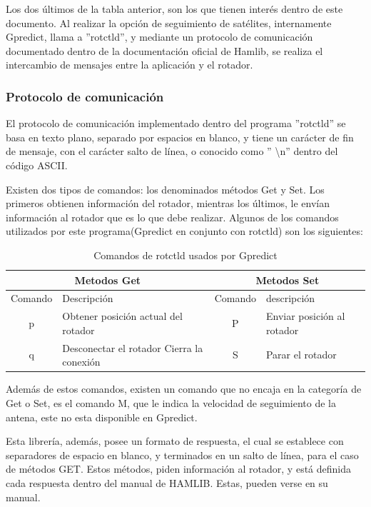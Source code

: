 Los dos últimos de la tabla anterior, son los que tienen interés dentro de este documento. Al realizar la opción de seguimiento de satélites, internamente Gpredict, llama a ''rotctld'', y mediante un protocolo de comunicación documentado dentro de la documentación oficial de Hamlib, se realiza el intercambio de mensajes entre la aplicación y el rotador. 

\subsubsection{Protocolo de comunicación} \label{subsub:protocol_com}
El protocolo de comunicación implementado dentro del programa ''rotctld'' se basa en texto plano, separado por espacios en blanco, y tiene un carácter de fin de mensaje, con el carácter salto de línea, o conocido como '' \textbackslash{}n'' dentro del código ASCII. 

Existen dos tipos de comandos: los denominados métodos Get y Set. Los primeros obtienen información del rotador, mientras los últimos, le envían información al rotador que es lo que debe realizar. Algunos de los comandos utilizados por este programa(Gpredict en conjunto con rotctld) son los siguientes: 

\begin{table}[H]
	\centering
	\begin{tabular}{|c|p{5cm}|c|p{5cm}|}
		\hline
		\multicolumn{2}{|c|}{Metodos Get}  &  \multicolumn{2}{c|}{Metodos Set}  \\ 
		\hline
		Comando & Descripción & Comando & descripción	\\
		\hline
		p & Obtener posición actual del rotador  &P& Enviar posición al rotador \\
		\hline 
		q & Desconectar el rotador 	Cierra la conexión & S & Parar el rotador \\ 
		\hline 	
	\end{tabular}
	\caption{Comandos de rotctld usados por Gpredict} 
	\label{tab:commands_Gpredict}
\end{table}

Además de estos comandos, existen un comando que no encaja en la categoría de Get o Set, es el comando M, que le indica la velocidad de seguimiento de la antena, este no esta disponible en Gpredict. 

Esta librería, además, posee un formato de respuesta, el cual se establece con separadores de espacio en blanco, y terminados en un salto de línea, para el caso de métodos GET. Estos métodos, piden información al rotador, y está definida cada respuesta dentro del manual de HAMLIB. Estas, pueden verse en su manual. 

